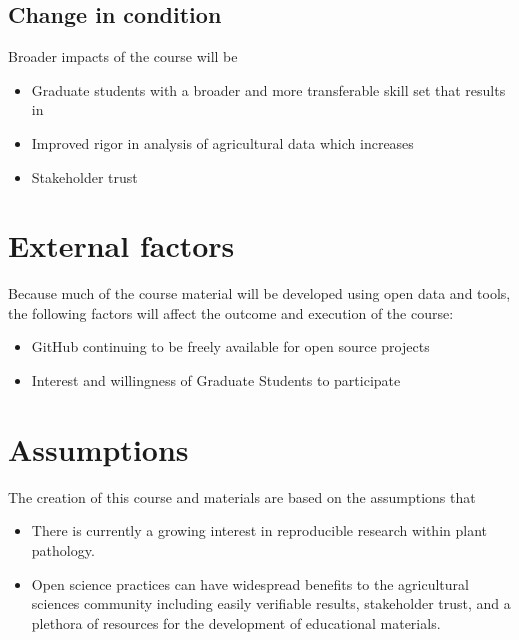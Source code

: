 \documentclass[12pt,letterpaper]{article}
\begin{document}
\subsection{Change in condition}

Broader impacts of the course will be

\begin{itemize}
	\item Graduate students with a broader and more transferable skill set that results in
	\item Improved rigor in analysis of agricultural data which increases
	\item Stakeholder trust 
\end{itemize}

\section{External factors}


Because much of the course material will be developed using open data and tools, the following factors will affect the outcome and execution of the course:

\begin{itemize}
	\item GitHub continuing to be freely available for open source projects
	\item Interest and willingness of Graduate Students to participate
\end{itemize}

\section{Assumptions}

The creation of this course and materials are based on the assumptions that
\begin{itemize}
	\item There is currently a growing interest in reproducible research within plant pathology.
	\item Open science practices can have widespread benefits to the agricultural sciences community including easily verifiable results, stakeholder trust, and a plethora of resources for the development of educational materials. 
\end{itemize}
\end{document}
